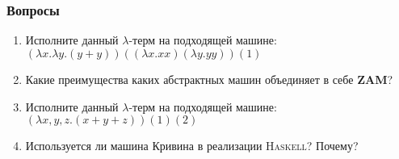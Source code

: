 \documentclass[aspectratio=1610]{beamer}
\begin{document}
\appendix
\section{}
\begin{frame}
  \frametitle{Вопросы}
  \begin{enumerate}
    \item Исполните данный $\lambda$-терм на подходящей машине: $(\lambda x.\lambda y.(y + y))((\lambda x. x x)(\lambda y. y y))(1)$
    \item Какие преимущества каких абстрактных машин объединяет в себе \textbf{ZAM}?
    \item Исполните данный $\lambda$-терм на подходящей машине: $(\lambda x, y, z.(x + y + z)) (1) (2)$
    \item Используется ли машина Кривина в реализации \textsc{Haskell}? Почему?
  \end{enumerate}
\end{frame}
% 
\end{document}
